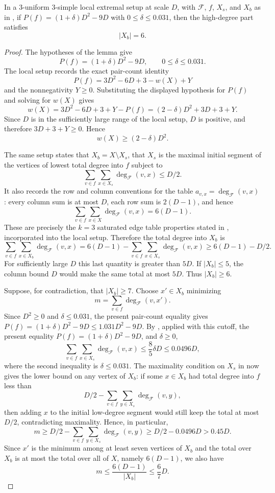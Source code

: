 \begin{lemma}
In a $3$-uniform $3$-simple local extremal setup at scale $D$, with
$\mathcal F$, $f$, $X_s$, and $X_b$ as in
, if
$P(f)=(1+\delta)D^2-9D$ with $0\le\delta\le0.031$, then the high-degree part
satisfies
\[
|X_b|=6.
\]
\end{lemma}
\begin{proof}
The hypotheses of the lemma give
\[
P(f)=(1+\delta)D^2-9D,\qquad 0\le\delta\le0.031.
\]
The local setup  records the exact
pair-count identity
\[
P(f)=3D^2-6D+3-w(X)+Y
\]
and the nonnegativity $Y\ge0$.  Substituting the displayed hypothesis for
$P(f)$ and solving for $w(X)$ gives
\[
w(X)=3D^2-6D+3+Y-P(f)
     =(2-\delta)D^2+3D+3+Y .
\]
Since $D$ is in the sufficiently large range of the local setup, $D$ is
positive, and therefore $3D+3+Y\ge0$.  Hence
\[
w(X)\ge (2-\delta)D^2. \tag{1}
\]

The same setup states that $X_b=X\setminus X_s$, that $X_s$ is the maximal
initial segment of the vertices of lowest total degree into $f$ subject to
\[
\sum_{v\in f}\sum_{x\in X_s}\deg_{\mathcal F}(v,x)\le D/2.
\]
It also records the row and column conventions for the table
$a_{v,x}=\deg_{\mathcal F}(v,x)$: every column sum is at most $D$, each row
sum is $2(D-1)$, and hence
\[
\sum_{v\in f}\sum_{x\in X}\deg_{\mathcal F}(v,x)=6(D-1).
\]
These are precisely the $k=3$ saturated edge table properties stated in
, incorporated into the local
setup.  Therefore the total degree into $X_b$ is
\[
\sum_{v\in f}\sum_{x\in X_b}\deg_{\mathcal F}(v,x)
=6(D-1)-\sum_{v\in f}\sum_{x\in X_s}\deg_{\mathcal F}(v,x)
\ge 6(D-1)-D/2.
\]
For sufficiently large $D$ this last quantity is greater than $5D$.  If
$|X_b|\le5$, the column bound $D$ would make the same total at most $5D$.
Thus $|X_b|\ge6$.

Suppose, for contradiction, that $|X_b|\ge7$.  Choose $x'\in X_b$ minimizing
\[
m=\sum_{v\in f}\deg_{\mathcal F}(v,x').
\]
Since $D^2\ge0$ and $\delta\le0.031$, the present pair-count equality gives
$P(f)=(1+\delta)D^2-9D\le1.031D^2-9D$.
By , applied with this cutoff,
the present equality $P(f)=(1+\delta)D^2-9D$, and $\delta\ge0$,
\[
\sum_{v\in f}\sum_{x\in X_s}\deg_{\mathcal F}(v,x)
\le \frac85\delta D\le0.0496D,
\]
where the second inequality is $\delta\le0.031$.  The maximality condition on
$X_s$ in  now gives the lower
bound on any vertex of $X_b$: if some $x\in X_b$ had total degree into $f$
less than
\[
D/2-\sum_{v\in f}\sum_{y\in X_s}\deg_{\mathcal F}(v,y),
\]
then adding $x$ to the initial low-degree segment would still keep the total
at most $D/2$, contradicting maximality.  Hence, in particular,
\[
m\ge D/2-\sum_{v\in f}\sum_{y\in X_s}\deg_{\mathcal F}(v,y)
\ge D/2-0.0496D>0.45D. \tag{2}
\]
Since $x'$ is the minimum among at least seven vertices of $X_b$ and the
total over $X_b$ is at most the total over all of $X$, namely $6(D-1)$, we
also have
\[
m\le \frac{6(D-1)}{|X_b|}\le \frac67D.
\tag{3}
\]


\end{proof}
